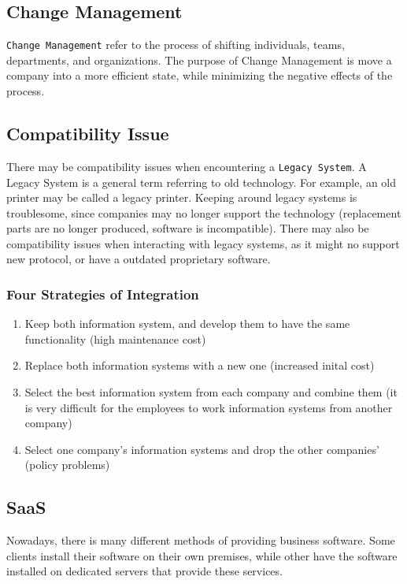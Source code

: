 \documentclass[../notes.tex]{subfiles}
\begin{document}
\subsection{Change Management}
\texttt{Change Management} refer to the process of shifting individuals, teams, departments, and organizations.
The purpose of Change Management is move a company into a more efficient state, while minimizing the negative effects of the process.

\subsection{Compatibility Issue}
There may be compatibility issues when encountering a \texttt{Legacy System}.
A Legacy System is a general term referring to old technology.
For example, an old printer may be called a legacy printer.
Keeping around legacy systems is troublesome, since companies may no longer support the technology (replacement parts are no longer produced, software is incompatible).
There may also be compatibility issues when interacting with legacy systems, as it might no support new protocol, or have a outdated proprietary software.

\subsubsection{Four Strategies of Integration}
\begin{enumerate}
	\item Keep both information system, and develop them to have the same functionality (high maintenance cost)
	\item Replace both information systems with a new one (increased inital cost)
	\item Select the best information system from each company and combine them (it is very difficult for the employees to work information systems from another company)
	\item Select one company's information systems and drop the other companies' (policy problems)
\end{enumerate}

\subsection{SaaS}
Nowadays, there is many different methods of providing business software.
Some clients install their software on their own premises, while other have the software installed on dedicated servers that provide these services.
\end{document}

